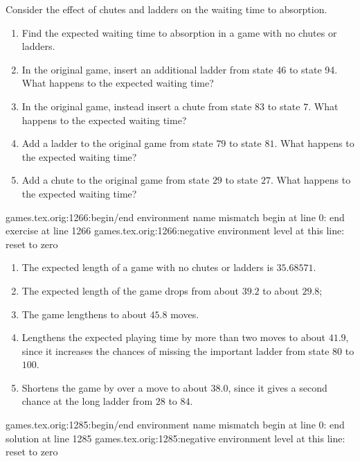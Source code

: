 \documentclass[12pt]{article}
\begin{document}
\begin{exercise}
    Consider the effect of chutes and ladders on the waiting time to
    absorption.
    \begin{enumerate}[label=(\alph*)]
    \item
        Find the expected waiting time to absorption in a game with no
        chutes or ladders.
    \item
        In the original game, insert an additional ladder from state 46
        to state 94.  What happens to the expected waiting time?
    \item
        In the original game, instead insert a chute from state 83 to
        state \( 7 \).  What happens to the expected waiting time?
    \item
        Add a ladder to the original game from state \( 79 \) to state \(
        81 \).  What happens to the expected waiting time?
    \item
        Add a chute to the original game from state \( 29 \) to state \(
        27 \).  What happens to the expected waiting time?
\end{enumerate}
games.tex.orig:1266:begin/end environment name mismatch
	begin {} at line 0: end {exercise} at line 1266
games.tex.orig:1266:negative environment level at this line: reset to zero
\end{exercise}
\begin{solution}
    \begin{enumerate}[label=(\alph*)]
    \item
        The expected length of a game with no chutes or ladders is \(
        35.68571 \).
    \item
        The expected length of the game drops from about \( 39.2 \) to
        about \( 29.8 \);
    \item
        The game lengthens to about \( 45.8 \) moves.
    \item
        Lengthens the expected playing time by more than two moves to
        about \( 41.9 \), since it increases the chances of missing the
        important ladder from state \( 80 \) to \( 100 \).
    \item
        Shortens the game by over a move to about \( 38.0 \), since it
        gives a second chance at the long ladder from \( 28 \) to \( 84 \).
\end{enumerate}
games.tex.orig:1285:begin/end environment name mismatch
	begin {} at line 0: end {solution} at line 1285
games.tex.orig:1285:negative environment level at this line: reset to zero
\end{solution}
\end{document}

